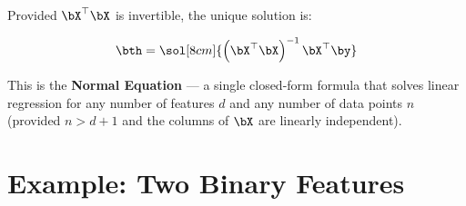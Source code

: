 \documentclass[12pt, a4paper]{article}
\begin{document}
Provided $\bX^{\top}\bX$ is invertible, the unique solution is:

\begin{resultbox}
  \[
    \bth = \sol[8cm]{\left(\bX^{\top}\bX\right)^{-1}\bX^{\top}\by}
  \]
\end{resultbox}

This is the \textbf{Normal Equation} — a single closed-form formula that solves
linear regression for any number of features $d$ and any number of data points
$n$ (provided $n > d+1$ and the columns of $\bX$ are linearly independent).

\section{Example: Two Binary Features}
\end{document}
